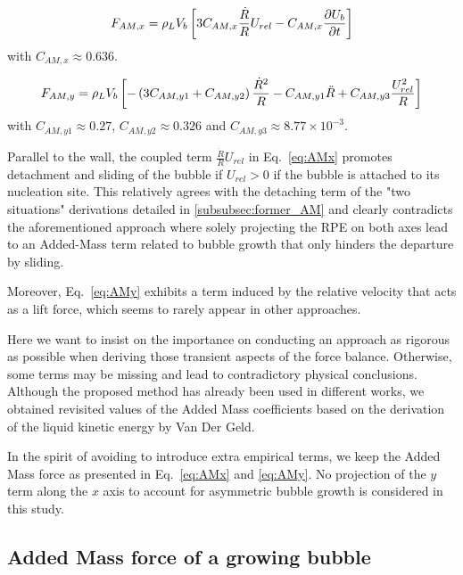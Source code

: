 \begin{align}
F_{AM,x}=\rho_{L}V_{b}\left[ 3C_{AM,x}\frac{\dot{R}}{R}U_{rel} - C_{AM,x}\frac{\partial{U_{b}}}{\partial t} \right]
\label{eq:AMx}
\end{align}
with $C_{AM,x} \approx 0.636$.


\begin{align}
F_{AM,y}=\rho_{L}V_{b}\left[ -\left( 3 C_{AM,y1} + C_{AM,y2} \right)\frac{\dot{R}^{2}}{R}-C_{AM,y1}\ddot{R} + C_{AM,y3}\frac{U_{rel}^{2}}{R} \right]
\label{eq:AMy}
\end{align}
with $C_{AM,y1} \approx 0.27$, $C_{AM,y2}\approx 0.326$ and $C_{AM,y3}\approx 8.77\times  10^{-3}$.


\npar
 
 


Parallel to the wall, the coupled term $\frac{\dot{R}}{R}U_{rel}$ in Eq.~\ref{eq:AMx} promotes detachment and sliding of the bubble if $U_{rel}>0$ \eg if the bubble is attached to its nucleation site. This relatively agrees with the detaching term of the "two situations" derivations detailed in \ref{subsubsec:former_AM} and clearly contradicts the aforementioned approach where solely projecting the RPE on both axes lead to an Added-Mass term related to bubble growth that only hinders the departure by sliding. 

Moreover, Eq.~\ref{eq:AMy} exhibits a term induced by the relative velocity that acts as a lift force, which seems to rarely appear in other approaches.

\npar
Here we want to insist on the importance on conducting an approach as rigorous as possible when deriving those transient aspects of the force balance. Otherwise, some terms may be missing and lead to contradictory physical conclusions. Although the proposed method has already been used in different works, we obtained revisited values of the Added Mass coefficients based on the derivation of the liquid kinetic energy by Van Der Geld.

In the spirit of avoiding to introduce extra empirical terms, we keep the Added Mass force as presented in Eq.~\ref{eq:AMx} and \ref{eq:AMy}. No projection of the $y$ term along the $x$ axis to account for asymmetric bubble growth is considered in this study.




\subsection{Added Mass force of a growing bubble}

